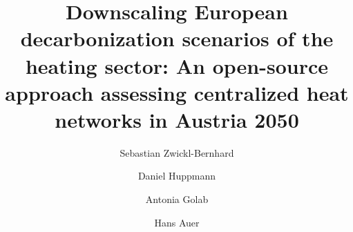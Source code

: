 \documentclass[review]{elsarticle}
\begin{document}
\begin{frontmatter}

\title{Downscaling European decarbonization scenarios of the heating sector: An open-source approach assessing centralized heat networks in Austria 2050}
\author[1]{Sebastian Zwickl-Bernhard}
\author[2]{Daniel Huppmann}
\author[1]{Antonia Golab}
\author[1]{Hans Auer}
\address[1]{Energy Economics Group (EEG), Technische Universität Wien, Gusshausstrasse 25-29/E370-3, 1040 Wien, Austria}
\address[2]{Energy, Climate and Environment (ECE) Program,  International Institute for Applied Systems Analysis (IIASA), Laxenburg, Austria}
\begin{abstract}
\end{abstract}

\begin{keyword}
\end{keyword}
\end{frontmatter}
\end{document}
